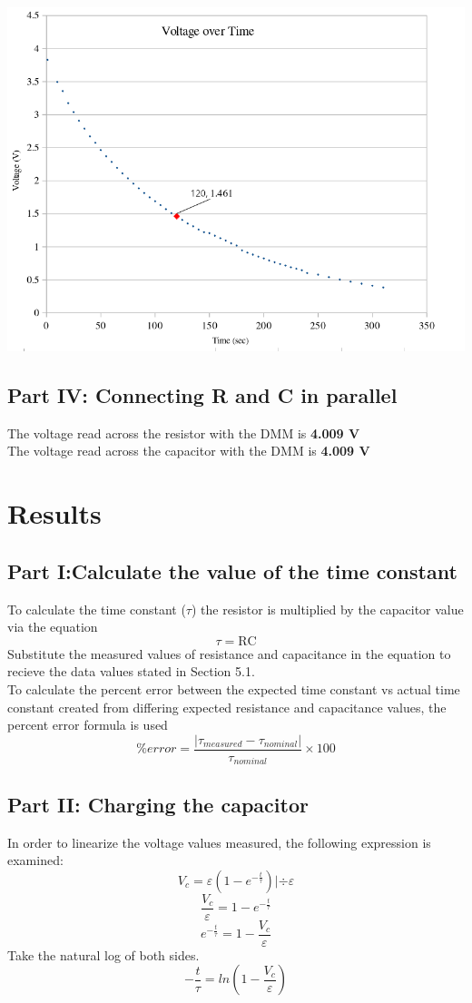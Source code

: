 \documentclass[titlepage]{article}
\begin{document}
		\FloatBarrier
		\begin{center}
\includegraphics[width=0.9\linewidth,frame]{help.png}
\end{center}
	\subsection{Part IV: Connecting R and C in parallel}
	The voltage read across the resistor with the DMM is \textbf{4.009 V}\\
The voltage read across the capacitor with the DMM is \textbf{4.009 V}\\
	\section{Results}
	\subsection{Part I:Calculate the value of the time constant}
	To calculate the time constant ($\tau$) the resistor is multiplied by the capacitor value via the equation 
	$$\tau = \text{RC}$$
	Substitute the measured values of resistance and capacitance in the equation to recieve the data values stated in Section 5.1.\\
	To calculate the percent error between the expected time constant vs actual time constant created from differing expected resistance and capacitance values, the percent error formula is used
	$$\% error = \frac{|\tau_{measured} - \tau_{nominal}|}{\tau_{nominal}} \times 100$$
	\subsection{Part II: Charging the capacitor}
	In order to linearize the voltage values measured, the following expression is examined:
    $$V_c = \varepsilon \left( 1- e^{-\frac{t}{\tau}} \right)  | \div \varepsilon  $$
    $$ \frac{V_c}{\varepsilon}= 1-e^{-\frac{t}{\tau}} $$
    $$ e^{-\frac{t}{\tau}} = 1-\frac{V_c}{\varepsilon} $$
    Take the natural log of both sides.
    $$ -\frac{t}{\tau} = ln\left( 1-\frac{V_c}{\varepsilon}  \right) $$
\end{document}
